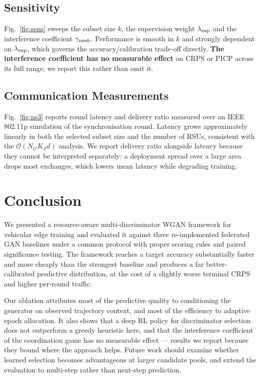\documentclass[journal]{IEEEtran}
\begin{document}
\subsection{Sensitivity}
Fig.~\ref{fig:sens} sweeps the subset size $k$, the supervision weight
$\lambda_{\rm sup}$ and the interference coefficient $\gamma_{\rm nash}$.
Performance is smooth in $k$ and strongly dependent on $\lambda_{\rm sup}$,
which governs the accuracy/calibration trade-off directly. \textbf{The
interference coefficient has no measurable effect} on CRPS or PICP across its
full range; we report this rather than omit it.

\subsection{Communication Measurements}
\label{sec:comm}
Fig.~\ref{fig:ns3} reports round latency and delivery ratio measured over an
IEEE 802.11p simulation of the synchronisation round. Latency grows
approximately linearly in both the selected subset size and the number of RSUs,
consistent with the $\mathcal{O}(N_G K_S d)$ analysis. We report delivery ratio
alongside latency because they cannot be interpreted separately: a deployment
spread over a large area drops most exchanges, which lowers mean latency while
degrading training.


\section{Conclusion}
We presented a resource-aware multi-discriminator WGAN framework for vehicular
edge training and evaluated it against three re-implemented federated GAN
baselines under a common protocol with proper scoring rules and paired
significance testing. The framework reaches a target accuracy substantially
faster and more cheaply than the strongest baseline and produces a far
better-calibrated predictive distribution, at the cost of a slightly worse
terminal CRPS and higher per-round traffic.

Our ablation attributes most of the predictive quality to conditioning the
generator on observed trajectory context, and most of the efficiency to
adaptive epoch allocation. It also shows that a deep RL policy for discriminator
selection does not outperform a greedy heuristic here, and that the interference
coefficient of the coordination game has no measurable effect --- results we
report because they bound where the approach helps. Future work should examine
whether learned selection becomes advantageous at larger candidate pools, and
extend the evaluation to multi-step rather than next-step prediction.
\end{document}
